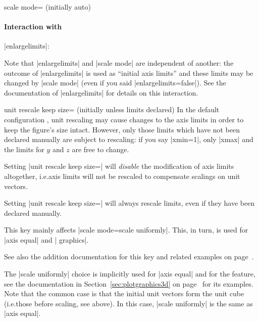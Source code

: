 \begin{pgfplotskey}{scale mode= (initially auto)}
    \paragraph{Interaction with }|enlargelimits|:

    Note that |enlargelimits| and |scale mode| are independent of another: the
    outcome of |enlargelimits| is used as ``initial axis limits'' and these
    limits may be changed by |scale mode| (even if you said
    |enlargelimits=false|). See the documentation of |enlargelimits| for
    details on this interaction.

    \begin{pgfplotskey}{unit rescale keep size= (initially unless limits declared)%
    }
        In the default configuration , unit
        rescaling may cause changes to the axis limits in order to keep the
        figure's size intact. However, only those limits which have not been
        declared manually are subject to rescaling: if you say |xmin=1|, only
        |xmax| and the limits for $y$ and $z$ are free to change.

        Setting |unit rescale keep size=| will
        \emph{disable} the modification of axis limits altogether, i.e.\@ axis
        limits will not be rescaled to compensate scalings on unit vectors.

        Setting |unit rescale keep size=| will always rescale
        limits, even if they have been declared manually.

        This key mainly affects |scale mode=scale uniformly|. This, in turn, is
        used for |axis equal| and | graphics|.

        See also the addition documentation for this key and related examples
        on page~\pageref{key:unit:rescale:keep:size}.
    \end{pgfplotskey}

    The |scale uniformly| choice is implicitly used for |axis equal| and for
    the  feature, see the documentation in
    Section~\ref{sec:plotgraphics3d} on page~\pageref{sec:plotgraphics3d} for
    its examples. Note that the common case is that the initial unit vectors
    form the unit cube (i.e.\@ those before scaling, see above). In this case,
    |scale uniformly| is the same as |axis equal|.
\end{pgfplotskey}
